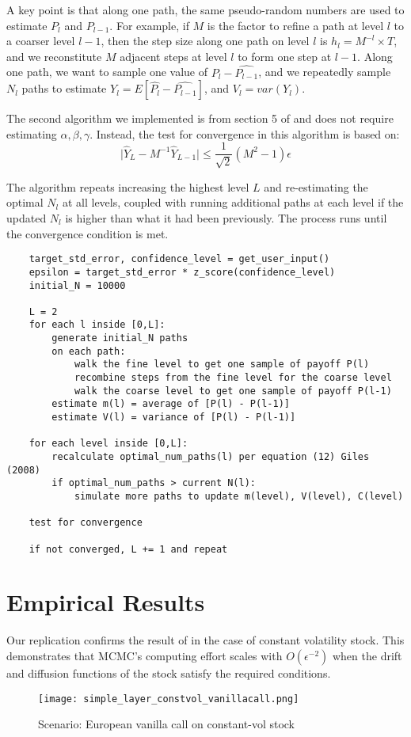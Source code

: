 \documentclass{article}
\begin{document}
    A key point is that along one path, the same pseudo-random numbers are used to estimate $P_l$ and $P_{l-1}$. For example, if $M$ is the factor to refine a path at level $l$ to a coarser level $l-1$, then the step size along one path on level $l$ is $h_l  = M^{-l} \times T$, and we reconstitute $M$ adjacent steps at level $l$ to form one step at $l-1$. Along one path, we want to sample one value of $\widehat{P_l} - \widehat{P_{l-1}}$, and we repeatedly sample $N_l$ paths to estimate $Y_l = E[\widehat{P_l} - \widehat{P_{l-1}}]$, and $V_l = var(Y_l)$.
    
    The second algorithm we implemented is from section 5 of \cite{giles08} and does not require estimating $\alpha, \beta, \gamma$. Instead, the test for convergence in this algorithm is based on:
    $$\mid \widehat{Y}_L - M^{-1} \widehat{Y}_{L-1} \mid \leq \frac{1}{\sqrt{2}} (M^2 - 1) \epsilon$$
    
    The algorithm repeats increasing the highest level $L$ and re-estimating the optimal $N_l$ at all levels, coupled with running additional paths at each level if the updated $N_l$ is higher than what it had been previously. The process runs until the convergence condition is met.
    
    \begin{lstlisting}
	target_std_error, confidence_level = get_user_input()
    epsilon = target_std_error * z_score(confidence_level)
	initial_N = 10000
    
    L = 2
    for each l inside [0,L]:
        generate initial_N paths
        on each path:
            walk the fine level to get one sample of payoff P(l)
            recombine steps from the fine level for the coarse level
            walk the coarse level to get one sample of payoff P(l-1)
        estimate m(l) = average of [P(l) - P(l-1)]
        estimate V(l) = variance of [P(l) - P(l-1)]       
        
    for each level inside [0,L]:
        recalculate optimal_num_paths(l) per equation (12) Giles (2008)    
        if optimal_num_paths > current N(l):
            simulate more paths to update m(level), V(level), C(level)
    
    test for convergence
    
    if not converged, L += 1 and repeat    
    \end{lstlisting}
	
\section{Empirical Results}
    Our replication confirms the result of \cite{giles08} in the case of constant volatility stock. This demonstrates that MCMC's computing effort scales with $O(\epsilon^{-2})$ when the drift and diffusion functions of the stock satisfy the required conditions. 
    \begin{figure}
        \texttt{[image: simple\_layer\_constvol\_vanillacall.png]}
        \caption{Scenario: European vanilla call on constant-vol stock}
        \label{fig:constvol_vanillacall}
    \end{figure}
    
\end{document}
